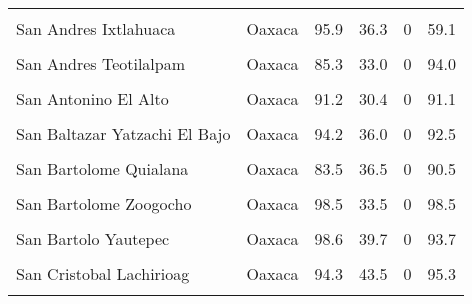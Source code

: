 \documentclass[
]{report}
\begin{document}
\begin{longtable}[t]{llrrrr}
\addlinespace
\cellcolor{gray!6}{San Andres Dinicuiti} & \cellcolor{gray!6}{Oaxaca} & \cellcolor{gray!6}{93.5} & \cellcolor{gray!6}{33.8} & \cellcolor{gray!6}{0} & \cellcolor{gray!6}{56.0}\\
San Andres Ixtlahuaca & Oaxaca & 95.9 & 36.3 & 0 & 59.1\\
\cellcolor{gray!6}{San Andres Solaga} & \cellcolor{gray!6}{Oaxaca} & \cellcolor{gray!6}{97.2} & \cellcolor{gray!6}{39.8} & \cellcolor{gray!6}{0} & \cellcolor{gray!6}{98.6}\\
San Andres Teotilalpam & Oaxaca & 85.3 & 33.0 & 0 & 94.0\\
\cellcolor{gray!6}{San Andres Yaa} & \cellcolor{gray!6}{Oaxaca} & \cellcolor{gray!6}{94.2} & \cellcolor{gray!6}{44.9} & \cellcolor{gray!6}{0} & \cellcolor{gray!6}{94.2}\\
\addlinespace
San Antonino El Alto & Oaxaca & 91.2 & 30.4 & 0 & 91.1\\
\cellcolor{gray!6}{San Baltazar Chichicapam} & \cellcolor{gray!6}{Oaxaca} & \cellcolor{gray!6}{92.8} & \cellcolor{gray!6}{33.8} & \cellcolor{gray!6}{0} & \cellcolor{gray!6}{91.8}\\
San Baltazar Yatzachi El Bajo & Oaxaca & 94.2 & 36.0 & 0 & 92.5\\
\cellcolor{gray!6}{San Bartolome Loxicha} & \cellcolor{gray!6}{Oaxaca} & \cellcolor{gray!6}{84.0} & \cellcolor{gray!6}{25.7} & \cellcolor{gray!6}{0} & \cellcolor{gray!6}{95.5}\\
San Bartolome Quialana & Oaxaca & 83.5 & 36.5 & 0 & 90.5\\
\addlinespace
\cellcolor{gray!6}{San Bartolome Yucuane} & \cellcolor{gray!6}{Oaxaca} & \cellcolor{gray!6}{95.8} & \cellcolor{gray!6}{27.7} & \cellcolor{gray!6}{0} & \cellcolor{gray!6}{100.0}\\
San Bartolome Zoogocho & Oaxaca & 98.5 & 33.5 & 0 & 98.5\\
\cellcolor{gray!6}{San Bartolo Soyaltepec} & \cellcolor{gray!6}{Oaxaca} & \cellcolor{gray!6}{96.2} & \cellcolor{gray!6}{34.4} & \cellcolor{gray!6}{0} & \cellcolor{gray!6}{88.5}\\
San Bartolo Yautepec & Oaxaca & 98.6 & 39.7 & 0 & 93.7\\
\cellcolor{gray!6}{San Carlos Yautepec} & \cellcolor{gray!6}{Oaxaca} & \cellcolor{gray!6}{91.8} & \cellcolor{gray!6}{38.3} & \cellcolor{gray!6}{0} & \cellcolor{gray!6}{94.8}\\
\addlinespace
San Cristobal Lachirioag & Oaxaca & 94.3 & 43.5 & 0 & 95.3\\
\cellcolor{gray!6}{San Cristobal Suchixtlahuaca} & \cellcolor{gray!6}{Oaxaca} & \cellcolor{gray!6}{100.0} & \cellcolor{gray!6}{43.6} & \cellcolor{gray!6}{0} & \cellcolor{gray!6}{66.2}\\

\end{longtable}
\end{document}
